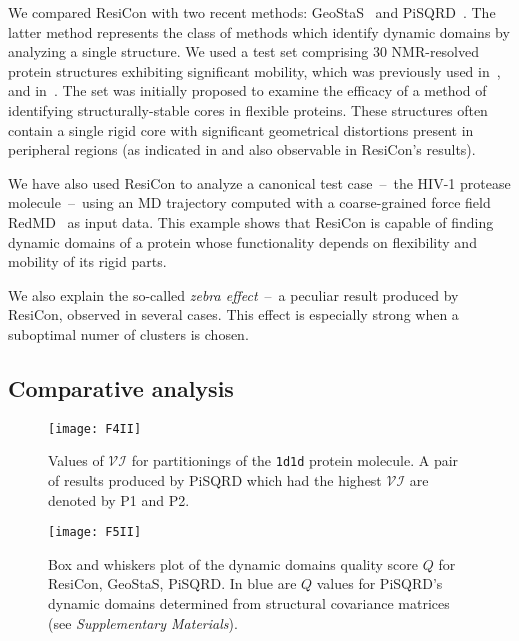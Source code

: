 \documentclass[a4paper,11pt,twoside]{book}%
\begin{document}
We compared ResiCon with two recent methods: GeoStaS~\cite{romanowska2012determining} and PiSQRD~\cite{potestio2009coarse}.
The latter method represents the class of methods which identify dynamic domains by analyzing a single structure.
We used a test set comprising 30 NMR-resolved protein structures exhibiting significant mobility, which was previously used in~\cite{snyder2005clustering,kirchner2011objective}, and in~\cite{romanowska2012determining}.
The set was initially proposed to examine the efficacy of a method of identifying structurally-stable cores in flexible proteins.
These structures often contain a single rigid core with significant geometrical distortions present in peripheral regions (as indicated in \cite{snyder2005clustering} and also observable in ResiCon's results). 

We have also used ResiCon to analyze a canonical test case~--~the HIV-1 protease molecule~--~using an MD trajectory computed with a coarse-grained force field RedMD~\cite{gorecki36causality,gorecki2009redmd} as input data.
This example shows that ResiCon is capable of finding dynamic domains of a protein whose functionality depends on flexibility and mobility of its rigid parts.

We also explain the so-called \emph{zebra effect}~--~a peculiar result produced by ResiCon, observed in several cases.
This effect is especially strong when a suboptimal numer of clusters is chosen.

\subsection*{Comparative analysis}



\begin{figure}
\centering
\texttt{[image: F4II]}
\caption{Values of $\mathcal{VI}$ for partitionings of the \texttt{1d1d} protein molecule.
A pair of results produced by PiSQRD which had the highest $\mathcal{VI}$ are denoted by P1 and P2.}
\label{comparison}
\end{figure}

\begin{figure*}
\centering
\texttt{[image: F5II]}
\caption{Box and whiskers plot of the dynamic domains quality score $Q$ for ResiCon, GeoStaS, PiSQRD.
In blue are $Q$ values for PiSQRD's dynamic domains determined from structural covariance matrices (see \emph{Supplementary Materials}).}
\label{boxWhiskers}
\end{figure*}
\end{document}
